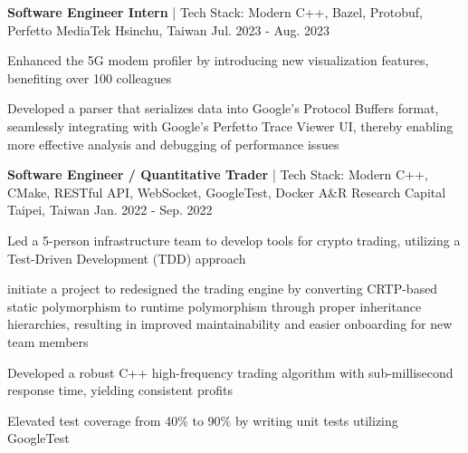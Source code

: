 \begin{cventries}
  \vspace{12pt}
  \cventry
    {\textbf {Software Engineer Intern} | \color{awesome} Tech Stack: Modern C++, Bazel, Protobuf, Perfetto} %
    {MediaTek} %
    {Hsinchu, Taiwan} %
    {Jul. 2023 - Aug. 2023} %
    {
      \begin{cvitems} %
        \item {Enhanced the 5G modem profiler by introducing new visualization features, benefiting over 100 colleagues}
        \item {Developed a parser that serializes data into Google's Protocol Buffers format, seamlessly integrating with Google's Perfetto Trace Viewer UI, thereby enabling more effective analysis and debugging of performance issues}
      \end{cvitems}
    }

  \vspace{12pt}

  \cventry
    {\textbf{Software Engineer / Quantitative Trader} | \color{awesome} Tech Stack: Modern C++, CMake, RESTful API, WebSocket, GoogleTest, Docker} %
    {A\&R Research Capital} %
    {Taipei, Taiwan} %
    {Jan. 2022 - Sep. 2022} %
    {
      \begin{cvitems} %
        \item Led a 5-person infrastructure team to develop tools for crypto trading, utilizing a Test-Driven Development (TDD) approach
        \item initiate a project to redesigned the trading engine by converting CRTP-based static polymorphism to runtime polymorphism through proper inheritance hierarchies, resulting in improved maintainability and easier onboarding for new team members
        \item Developed a robust C++ high-frequency trading algorithm with sub-millisecond response time, yielding consistent profits 
        \item Elevated test coverage from 40\% to 90\% by writing unit tests utilizing GoogleTest
      \end{cvitems}
    }

  \vspace{12pt}

\end{cventries}
